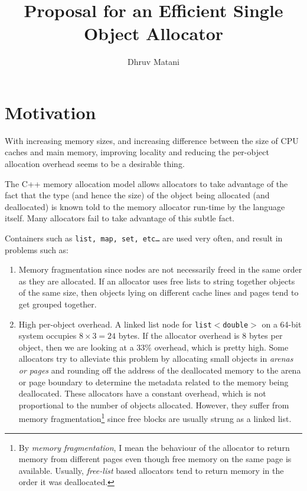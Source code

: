 \documentclass{article}
\title{Proposal for an Efficient Single Object Allocator}
\author{Dhruv Matani}
\begin{document}
\maketitle

\clearpage

\tableofcontents

\clearpage

\section{Motivation}

With increasing memory sizes, and increasing difference between the
size of CPU caches and main memory, improving locality and reducing
the per-object allocation overhead seems to be a desirable thing.

The C++ memory allocation model allows allocators to take advantage of
the fact that the type (and hence the size) of the object being
allocated (and deallocated) is known told to the memory allocator
run-time by the language itself. Many allocators fail to take
advantage of this subtle fact.

Containers such as \texttt{list, map, set, etc\ldots{}} are used very
often, and result in problems such as:

\begin{enumerate}

\item Memory fragmentation since nodes are not necessarily freed in
  the same order as they are allocated. If an allocator uses free
  lists to string together objects of the same size, then objects
  lying on different cache lines and pages tend to get grouped
  together.

\item High per-object overhead. A linked list node for
  \texttt{list$<$double$>$} on a 64-bit system occupies $8 \times 3 =
  24$ bytes. If the allocator overhead is $8$ bytes per object, then
  we are looking at a $33\%$ overhead, which is pretty high. Some
  allocators try to alleviate this problem by allocating small objects
  in \textit{arenas or pages} and rounding off the address of the
  deallocated memory to the arena or page boundary to determine the
  metadata related to the memory being deallocated. These allocators
  have a constant overhead, which is not proportional to the number of
  objects allocated. However, they suffer from memory
  fragmentation\footnote{By \textit{memory fragmentation}, I mean the
    behaviour of the allocator to return memory from different pages
    even though free memory on the same page is available. Usually,
    \textit{free-list} based allocators tend to return memory in the
    order it was deallocated.} since free blocks are usually strung as
  a linked list.

\end{enumerate}
\end{document}
